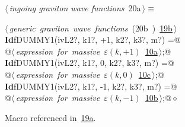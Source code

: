 \documentclass[a4paper,12pt]{amsart}
\renewcommand{\NWtarget}[2]{\hypertarget{#1}{#2}}
\renewcommand{\NWlink}[2]{\hyperlink{#1}{#2}}
\renewcommand{\NWtxtMacroRefIn}{Macro referenced in}
\renewcommand{\NWsep}{${\diamond}$}
\begin{document}
\begin{flushleft} \small
\begin{minipage}{\linewidth}\label{scrap41}\raggedright\small
\NWtarget{nuweb20a}{} $\langle\,${\itshape ingoing graviton wave functions}\nobreak\ {\footnotesize {20a}}$\,\rangle\equiv$
\vspace{-1ex}
\begin{list}{}{} \item
\mbox{}\verb@@\hbox{$\langle\,${\itshape generic graviton wave functions}\nobreak\ ({\footnotesize 20b\label{scrap42}
 }\mbox{}\verb@inp@ ) {\footnotesize \NWlink{nuweb19b}{19b}}$\,\rangle$}\verb@@\\
\mbox{}\verb@@\hbox{\sffamily\bfseries Id}\verb@ fDUMMY1(ivL2?, k1?, +1, k2?, k3?, m?) =@\\
\mbox{}\verb@   @\hbox{$\langle\,${\itshape expression for massive $\varepsilon(k, +1)$}\nobreak\ {\footnotesize \NWlink{nuweb10a}{10a}}$\,\rangle$}\verb@;@\\
\mbox{}\verb@@\hbox{\sffamily\bfseries Id}\verb@ fDUMMY1(ivL2?, k1?, 0, k2?, k3?, m?) =@\\
\mbox{}\verb@   @\hbox{$\langle\,${\itshape expression for massive $\varepsilon(k, 0)$}\nobreak\ {\footnotesize \NWlink{nuweb10c}{10c}}$\,\rangle$}\verb@;@\\
\mbox{}\verb@@\hbox{\sffamily\bfseries Id}\verb@ fDUMMY1(ivL2?, k1?, -1, k2?, k3?, m?) =@\\
\mbox{}\verb@   @\hbox{$\langle\,${\itshape expression for massive $\varepsilon(k, -1)$}\nobreak\ {\footnotesize \NWlink{nuweb10b}{10b}}$\,\rangle$}\verb@;@{\NWsep}
\end{list}
\vspace{-1.5ex}
\footnotesize
\begin{list}{}{\setlength{\itemsep}{-\parsep}\setlength{\itemindent}{-\leftmargin}}
\item \NWtxtMacroRefIn\ \NWlink{nuweb19a}{19a}.

\item{}
\end{list}
\end{minipage}\vspace{4ex}
\end{flushleft}
\end{document}
